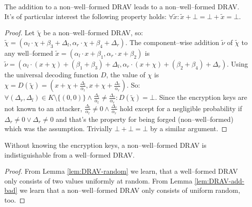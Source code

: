 \begin{lem}
  \label{lem:DRAV-add-bad}

The addition to a non--well--formed DRAV leads to a non--well--formed DRAV. It's
of particular interest the following property holds: $\forall \widetilde{x}:
\widetilde{x} + \bot = \bot + \widetilde{x} = \bot$.

\end{lem}

\begin{proof}

Let $\widetilde{\chi}$ be a
non--well--formed DRAV, so: $\widetilde{\chi} = (\alpha_l \cdot \chi + \beta_3 +
\Delta_l, \alpha_r \cdot \chi + \beta_4 + \Delta_r)$. The component--wise
addition $\widetilde{\nu}$ of $\widetilde{\chi}$ to any well--formed
$\widetilde{x} = (\alpha_l \cdot x + \beta_1, \alpha_r \cdot x + \beta_2)$ is
$\widetilde{\nu} = (\alpha_l \cdot (x+\chi) + (\beta_1+\beta_3) + \Delta_l,
\alpha_r \cdot (x+\chi) + (\beta_2+\beta_4) + \Delta_r)$. Using the universal
decoding function $D$, the value of $\chi$ is $\chi = D(\widetilde{\chi}) = (x +
\chi + \frac{\Delta_l}{\alpha_l}, x + \chi + \frac{\Delta_r}{\alpha_r})$. So:
$\forall (\Delta_r, \Delta_l) \in K \setminus \{(0, 0)\} \wedge
\frac{\Delta_l}{\alpha_l} \neq \frac{\Delta_r}{\alpha_r}: D(\widetilde{\chi}) =
\bot$. Since the encryption keys are not known to an attacker,
$\frac{\Delta_l}{\alpha_l} \neq 0 \wedge \frac{\Delta_r}{\alpha_r}$ hold except
for a negligible probability if $\Delta_r \neq 0 \vee \Delta_r \neq 0$ and
that's the property for being forged (non--well--formed) which was the
assumption. Trivially $\bot + \bot = \bot$ by a similar argument.

\end{proof}

\begin{lem}

  Without knowing the encryption keys, a non--well--formed DRAV is
  indistiguishable from a well--formed DRAV.

\end{lem}

\begin{proof}

  From Lemma \ref{lem:DRAV-random} we learn, that a well--formed DRAV only
  consists of two values uniformly at random. From Lemma \ref{lem:DRAV-add-bad}
  we learn that a non--well--formed DRAV only consists of uniform random, too.


\end{proof}


